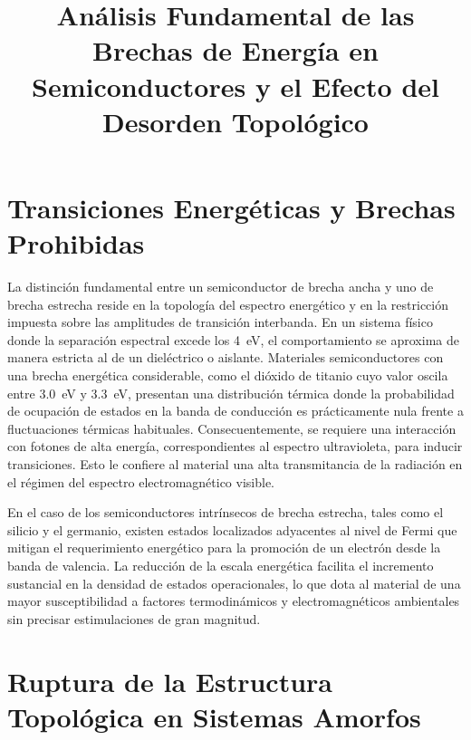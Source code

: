 \documentclass[pdflatex,sn-mathphys-num]{sn-jnl}
\theoremstyle{thmstyleone}%
\theoremstyle{thmstyletwo}%
\theoremstyle{thmstylethree}%
\begin{document}
\title[Análisis de Brechas en Semiconductores]{Análisis Fundamental de las
Brechas de Energía en Semiconductores y el Efecto del Desorden Topológico}

\author{ }


\maketitle

\section{Transiciones Energéticas y Brechas Prohibidas}
\label{sec:brechas}

La distinción fundamental entre un semiconductor de brecha ancha y uno de brecha
estrecha reside en la topología del espectro energético y en la restricción
impuesta sobre las amplitudes de transición interbanda. En un sistema físico
donde la separación espectral excede los \qty{4}{\eV}, el comportamiento se
aproxima de manera estricta al de un dieléctrico o aislante.
Materiales semiconductores con una brecha energética considerable, como el
dióxido de titanio cuyo valor oscila entre \qty{3.0}{\eV} y \qty{3.3}{\eV},
presentan una distribución térmica donde la probabilidad de ocupación de estados
en la banda de conducción es prácticamente nula frente a fluctuaciones térmicas
habituales.
Consecuentemente, se requiere una interacción con fotones de alta energía,
correspondientes al espectro ultravioleta, para inducir transiciones. Esto le
confiere al material una alta transmitancia de la radiación en el régimen del
espectro electromagnético visible.

En el caso de los semiconductores intrínsecos de brecha estrecha, tales como el
silicio y el germanio, existen estados localizados adyacentes al nivel de Fermi
que mitigan el requerimiento energético para la promoción de un electrón desde
la banda de valencia. La reducción de la escala energética
facilita el incremento sustancial en la densidad de estados operacionales, lo
que dota al material de una mayor susceptibilidad a factores termodinámicos y
electromagnéticos ambientales sin precisar estimulaciones de gran magnitud.

\section{Ruptura de la Estructura Topológica en Sistemas Amorfos}
\label{sec:amorfos}
\end{document}
